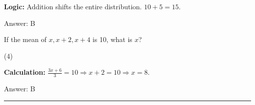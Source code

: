 \documentclass[11pt,paper=a4,answers]{exam}
\begin{document}
\begin{questions}
\begin{solution}
\textbf{Logic:} Addition shifts the entire distribution. $10 + 5 = 15$.

\vspace{30pt}

Answer: \colorbox{yellow!100}{B}
\end{solution}

\vspace{60pt}

\question
If the mean of $x, x+2, x+4$ is 10, what is $x$?
\begin{tasks}(4)
\end{tasks}

\begin{solution}
\textbf{Calculation:} $\frac{3x + 6}{3} = 10 \Rightarrow x + 2 = 10 \Rightarrow x = 8$.

\vspace{30pt}

Answer: \colorbox{yellow!100}{B}
\end{solution}


\end{questions}
\begin{center}
\rule{.5\textwidth}{1pt}
\end{center}
\end{document}
